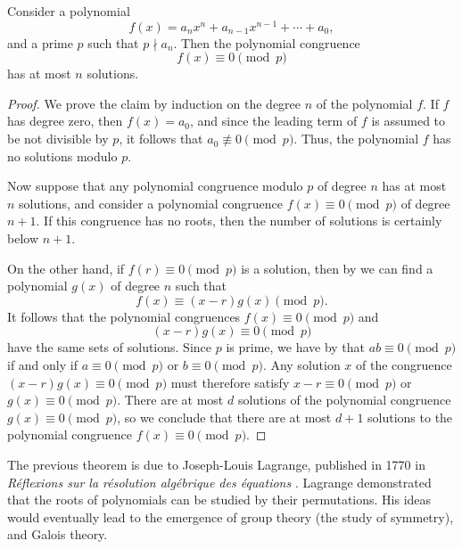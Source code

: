 \begin{theorem}\label{theorem:lagranges-theorem}
  Consider a polynomial
  \begin{equation*}
    f(x) = a_nx^n+ a_{n-1}x^{n-1} +\cdots + a_0,
  \end{equation*}
  and a prime $p$ such that $p\nmid a_n$. Then the polynomial congruence
  \begin{equation*}
    f(x)\equiv 0 \pmod{p}
  \end{equation*}
  has at most $n$ solutions.
\end{theorem}

\begin{proof}
  We prove the claim by induction on the degree $n$ of the polynomial $f$. If $f$ has degree zero, then $f(x)=a_0$, and since the leading term of $f$ is assumed to be not divisible by $p$, it follows that $a_0\nequiv 0\pmod{p}$. Thus, the polynomial $f$ has no solutions modulo $p$.

  Now suppose that any polynomial congruence modulo $p$ of degree $n$ has at most $n$ solutions, and consider a polynomial congruence $f(x)\equiv 0\pmod{p}$ of degree $n+1$. If this congruence has no roots, then the number of solutions is certainly below $n+1$.

  On the other hand, if $f(r)\equiv 0\pmod{p}$ is a solution, then by  we can find a polynomial $g(x)$ of degree $n$ such that
  \begin{equation*}
    f(x)\equiv (x-r)g(x) \pmod{p}.
  \end{equation*}
  It follows that the polynomial congruences $f(x)\equiv 0\pmod{p}$ and
  \begin{equation*}
    (x-r)g(x)\equiv 0 \pmod{p}
  \end{equation*}
  have the same sets of solutions. Since $p$ is prime, we have by  that $ab\equiv 0\pmod{p}$ if and only if $a\equiv 0\pmod{p}$ or $b\equiv 0\pmod{p}$. Any solution $x$ of the congruence $(x-r)g(x)\equiv 0\pmod{p}$ must therefore satisfy $x-r\equiv 0\pmod{p}$ or $g(x)\equiv 0\pmod{p}$. There are at most $d$ solutions of the polynomial congruence $g(x)\equiv 0\pmod{p}$, so we conclude that there are at most $d+1$ solutions to the polynomial congruence $f(x)\equiv 0\pmod{p}$.
\end{proof}

The previous theorem is due to Joseph-Louis Lagrange, published in 1770 in \emph{Réflexions sur la résolution algébrique des équations} \cite{lagrange1770}. Lagrange demonstrated that the roots of polynomials can be studied by their permutations. His ideas would eventually lead to the emergence of group theory (the study of symmetry), and Galois theory.

